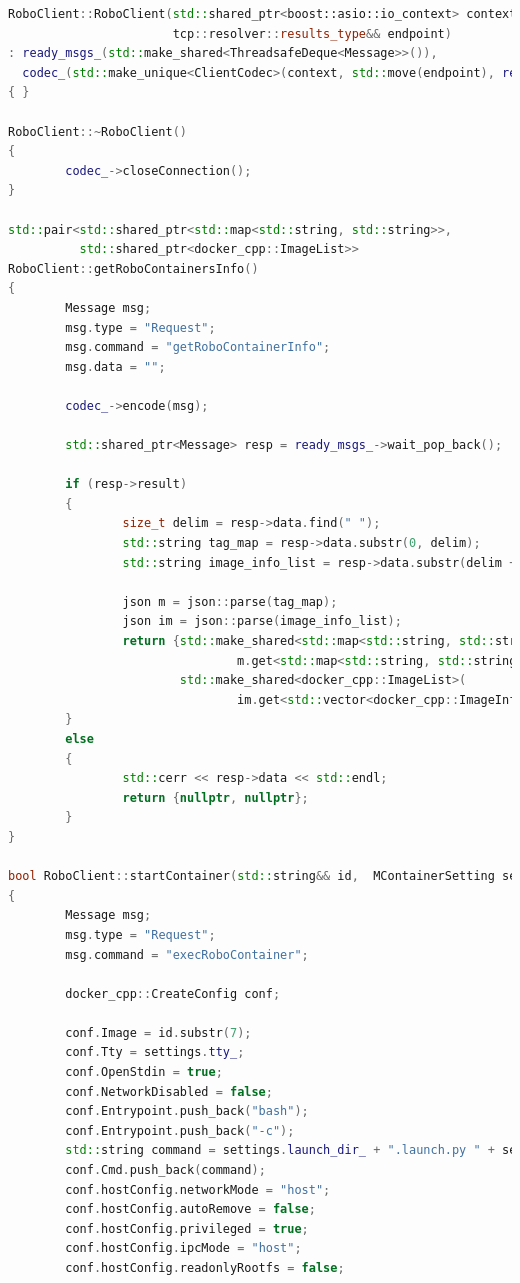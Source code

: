 \documentclass[a4paper, 14pt]{extreport}
\begin{document}
\begin{lstlisting}[language=C++, frame=single, xleftmargin=15pt, caption={Определение методов класса RoboClient},label=DescriptiveLabel]
RoboClient::RoboClient(std::shared_ptr<boost::asio::io_context> context,
                       tcp::resolver::results_type&& endpoint)
: ready_msgs_(std::make_shared<ThreadsafeDeque<Message>>()), 
  codec_(std::make_unique<ClientCodec>(context, std::move(endpoint), ready_msgs_))
{ }

RoboClient::~RoboClient()
{
        codec_->closeConnection();
}

std::pair<std::shared_ptr<std::map<std::string, std::string>>,
          std::shared_ptr<docker_cpp::ImageList>>
RoboClient::getRoboContainersInfo()
{
        Message msg;
        msg.type = "Request";
        msg.command = "getRoboContainerInfo";
        msg.data = "";

        codec_->encode(msg);

        std::shared_ptr<Message> resp = ready_msgs_->wait_pop_back();

        if (resp->result)
        {
                size_t delim = resp->data.find(" ");
                std::string tag_map = resp->data.substr(0, delim);
                std::string image_info_list = resp->data.substr(delim + 1);

                json m = json::parse(tag_map);
                json im = json::parse(image_info_list);
                return {std::make_shared<std::map<std::string, std::string>>(
                                m.get<std::map<std::string, std::string>>()),
                        std::make_shared<docker_cpp::ImageList>(
                                im.get<std::vector<docker_cpp::ImageInfo>>())};
        }
        else
        {
                std::cerr << resp->data << std::endl;
                return {nullptr, nullptr};
        }
}

bool RoboClient::startContainer(std::string&& id,  MContainerSetting settings)
{
        Message msg;
        msg.type = "Request";
        msg.command = "execRoboContainer";

        docker_cpp::CreateConfig conf;

        conf.Image = id.substr(7);
        conf.Tty = settings.tty_;
        conf.OpenStdin = true;
        conf.NetworkDisabled = false;
        conf.Entrypoint.push_back("bash");
        conf.Entrypoint.push_back("-c");
        std::string command = settings.launch_dir_ + ".launch.py " + settings.arguments_;
        conf.Cmd.push_back(command);
        conf.hostConfig.networkMode = "host";
        conf.hostConfig.autoRemove = false;
        conf.hostConfig.privileged = true;
        conf.hostConfig.ipcMode = "host";
        conf.hostConfig.readonlyRootfs = false;


\end{lstlisting}
\end{document}
